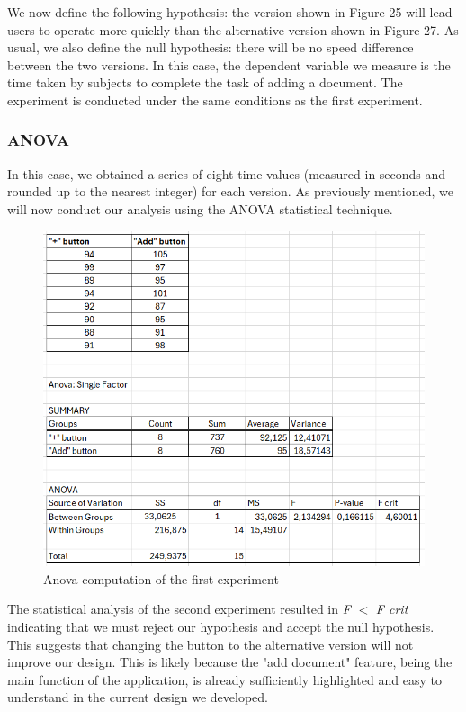 			\noindent
			We now define the following hypothesis: the version shown in Figure 25 will lead users to operate more quickly than the alternative version shown in Figure 27. As usual, we also define the null hypothesis: there will be no speed difference between the two versions. In this case, the dependent variable we measure is the time taken by subjects to complete the task of adding a document. The experiment is conducted under the same conditions as the first experiment.\\
			\clearpage
		\subsubsection{ANOVA}
			In this case, we obtained a series of eight time values (measured in seconds and rounded up to the nearest integer) for each version. As previously mentioned, we will now conduct our analysis using the ANOVA statistical technique.
			\begin{figure}[htbp]
				\centering
				\includegraphics[width=1\textwidth]{../Draw.io diagrams/anova_+_add.png}  %
				\caption{Anova computation of the first experiment}
			\end{figure}
			
			\noindent
			The statistical analysis of the second experiment resulted in \textit{F} \(<\) \textit{F crit} indicating that we must reject our hypothesis and accept the null hypothesis. This suggests that changing the button to the alternative version will not improve our design. This is likely because the "add document" feature, being the main function of the application, is already sufficiently highlighted and easy to understand in the current design we developed.
			\clearpage
